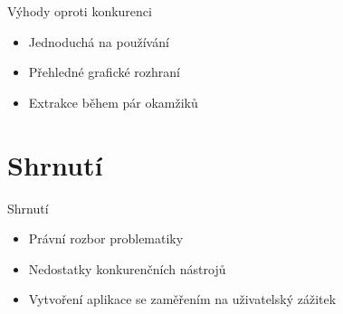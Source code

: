 \documentclass[czech,aspectratio=169]{beamer}
\begin{document}
	\begin{frame}{Výhody oproti konkurenci}
		\begin{itemize}
			\item Jednoduchá na používání
			\item Přehledné grafické rozhraní
			\item Extrakce během pár okamžiků 
		\end{itemize}
	\end{frame}

	
	\section{Shrnutí}
	 \begin{frame}{Shrnutí}
	 	\begin{itemize}
	 		\item Právní rozbor problematiky
	 		\item Nedostatky konkurenčních nástrojů
	 		\item Vytvoření aplikace se zaměřením na uživatelský zážitek
	 	\end{itemize}
	 \end{frame}
\end{document}
